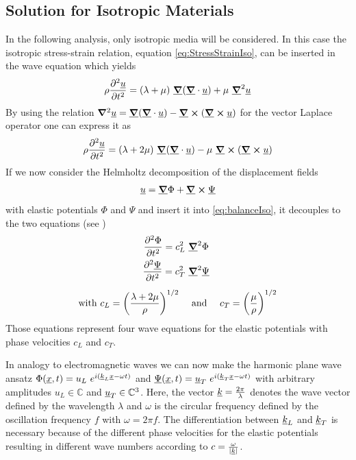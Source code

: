 
\subsection{Solution for Isotropic Materials}
\label{sec:IsoSolution}
In the following analysis, only isotropic media will be considered. In this
case the isotropic stress-strain relation, equation
\ref{eq:StressStrainIso}, can be inserted in the wave equation which
yields
\begin{equation}
    \rho \ddiff{\uline{u}}{t} = (\lambda + \mu)\ \uline{\gradient}
    (\uline{\gradient}\cdot \uline{u}) + \mu\ \uline{\gradient}^2 \uline{u}
\end{equation}
By using the relation $\gradient^2 \uline u = \uline{\gradient}
    (\uline{\gradient}\cdot \uline{u}) - \uline{\gradient}
    \cross(\uline{\gradient} \cross \uline{u})$ for the vector Laplace operator
one can express it as
\begin{equation} \label{eq:balanceIso}
    \rho \ddiff{\uline{u}}{t} = (\lambda + 2\mu)\ \uline{\gradient}
    (\uline{\gradient}\cdot \uline{u})- \mu\ \uline{\grad }
    \cross (\uline{\gradient}\cross \uline{u})
\end{equation}
If we now consider the Helmholtz decomposition of the displacement fields
\begin{equation} \label{eq:Helmholtz}
    \uline{u} = \uline{\gradient}\Phi + \uline{\gradient}\cross \uline{\Psi}
\end{equation}
with elastic potentials $\Phi$ and $\Psi$ and insert it into
\ref{eq:balanceIso},
it decouples to the two equations (see \cite{BedfordElasticWaves})
\begin{align}
    \ddiff{\Phi}{t} = c_L^2\
     & \uline{\gradient}^2\Phi         \\
    \ddiff{\uline{\Psi}}{t} = c_T^2\
     & \uline{\gradient}^2\uline{\Psi} \\[5pt]
    \text{with } c_L = \left(\frac{\lambda + 2\mu}{\rho}\right)^{1/2} \quad
     &
    \text{ and } \quad c_T = \left(\frac{\mu}{\rho}\right)^{1/2}
    \label{eq:veldef}
\end{align}
Those equations represent four wave equations for the elastic potentials with
phase velocities $c_L$ and $c_T$.

In analogy to electromagnetic waves we can now make the harmonic
plane wave ansatz $\Phi(\underline{x}, t)= u_L\
    e^{i(\underline{k}_L \underline{x}-\omega t)}$ and $\underline{\Psi}(\underline{x}, t)
    =
    \underline{u}_T \ e^{i(\underline{k}_T\underline{x}-\omega t)}$ with arbitrary
amplitudes $u_L\in\mathbb{C}$ and $\underline{u}_T\in \mathbb{C}^3$.
Here, the vector
$\underline{k}=\frac{2\pi}{\lambda}$ denotes the wave vector defined by the
wavelength $\lambda$ and $\omega$ is the circular frequency defined by the
oscillation frequency $f$ with	$\omega = 2 \pi f$. The differentiation between
$\underline{k}_L$ and $\underline{k}_T$ is necessary because of the different
phase velocities for the elastic potentials resulting in different wave numbers
according to $c = \frac{\omega}{|\underline{k}|}$.

